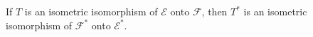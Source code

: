 If $T$ is an isometric isomorphism of $\mathcal{E}$ onto $\mathcal{F}$, then $T^*$ is an isometric isomorphism of $\mathcal{F}^*$ onto $\mathcal{E}^*$.
